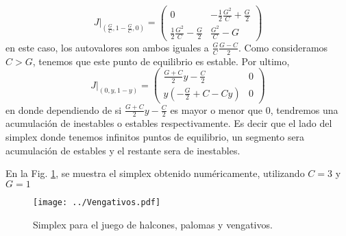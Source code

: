 \begin{equation}
J |_{\left(\frac{G}{C},1-\frac{G}{C},0\right)}=
\begin{pmatrix}
    0  & -\frac{1}{2}\frac{G^2}{C} + \frac{G}{2} \\[6pt]
    \frac{1}{2}\frac{G^2}{C} - \frac{G}{2}       & \frac{G^2}{C} - G
\end{pmatrix}
\end{equation}
en este caso, los autovalores son ambos iguales a $\frac{G}{C}\frac{G-C}{2}$. Como consideramos $C >G$, tenemos que este punto de equilibrio es estable. Por ultimo,
\begin{equation}
J |_{\left(0,y,1-y\right)} =
\begin{pmatrix}
    \frac{G+C}{2}y - \frac{C}{2}  & 0 \\[6pt]
    y\left(-\frac{G}{2} + C - Cy\right)       & 0
\end{pmatrix}
\end{equation}
en donde dependiendo de si $\frac{G+C}{2}y - \frac{C}{2}$ es mayor o menor que 0, tendremos una acumulación de inestables o estables respectivamente. Es decir que el lado del simplex donde tenemos infinitos puntos de equilibrio, un segmento sera acumulación de estables y el restante sera de inestables.

En la Fig. \ref{ej1:Vengadores}, se muestra el simplex obtenido numéricamente, utilizando $C=3$ y $G=1$ 

\begin{figure}[ht!]
    \centering
    \texttt{[image: ../Vengativos.pdf]}
    \caption{Simplex para el juego de halcones, palomas y vengativos.}
    \label{ej1:Vengadores}
\end{figure}